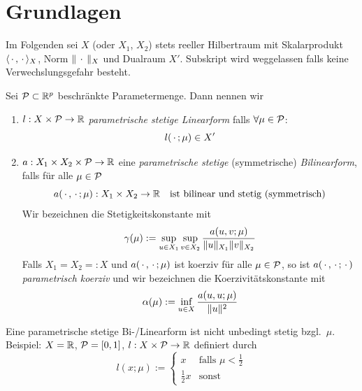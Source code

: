\section{Grundlagen}
\label{sec-2}

Im Folgenden sei $X$ (oder $X_1$, $X_2$) stets reeller Hilbertraum mit Skalarprodukt $\langle \,\cdot\,, \,\cdot\, \rangle_X$, Norm $\|\,\cdot\,\|_X$ und Dualraum $X'$.
Subskript wird weggelassen falls keine Verwechslungsgefahr besteht.

\begin{defn}
	Sei $\mathcal{P} \subset \mathbb{R}^p$ beschränkte Parametermenge. Dann nennen wir
	\begin{enumerate}
		\item $l: X \times \mathcal{P} \to \mathbb{R}$ \emph{parametrische stetige Linearform} falls $\forall \mu \in \mathcal{P}$:
			\[
				l(\,\cdot\,;\mu) \in X'
			\]
		\item $a: X_1 \times X_2 \times \mathcal{P} \to \mathbb{R}$ eine \emph{parametrische stetige} (symmetrische) \emph{Bilinearform}, falls für alle $\mu \in \mathcal{P}$
			\[
				a(\,\cdot\,,\,\cdot\,;\mu) : X_1 \times X_2 \to \mathbb{R} \quad \text{ist bilinear und stetig (symmetrisch)}
			\]
			Wir bezeichnen die Stetigkeitskonstante mit
			\[
				\gamma(\mu) := \sup_{u \in X_1} \sup_{v \in X_2} \frac{a(u,v;\mu)}{\|u\|_{X_1}\|v\|_{X_2}}
			\]
			Falls $X_1 = X_2 =: X$ und $a(\,\cdot\,,\,\cdot\,;\mu)$ ist koerziv für alle $\mu \in \mathcal{P}$, so ist $a(\,\cdot\,,\,\cdot\,;\,\cdot\,)$ \emph{parametrisch koerziv} und wir bezeichnen die Koerzivitätskonstante mit
			\[
				\alpha(\mu) := \inf_{u \in X} \frac{a(u,u;\mu)}{\|u\|^2}
			\]
	\end{enumerate}
\end{defn}

\begin{bem}
	Eine parametrische stetige Bi-/Linearform ist nicht unbedingt stetig bzgl.\ $\mu$.
	Beispiel: $X = \mathbb{R}$, $\mathcal{P} = [0,1]$, $l : X \times \mathcal{P} \to \mathbb{R}$ definiert durch
	\[
		l(x;\mu) := \begin{cases}
			x & \text{falls } \mu < \frac 1 2 \\
			\frac 1 2 x & \text{sonst}
		\end{cases}
	\]
\end{bem}

